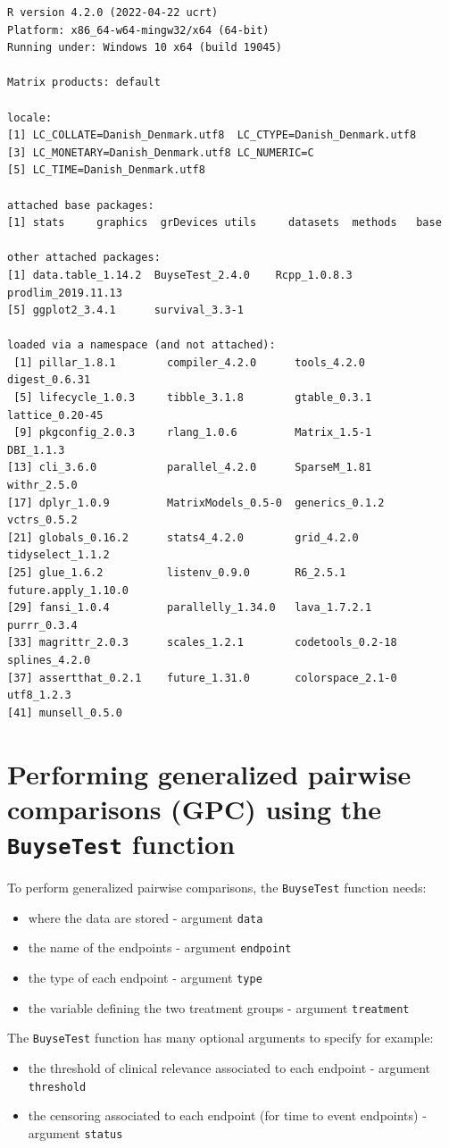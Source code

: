 \documentclass[12pt]{article}
\begin{document}
\begin{verbatim}
R version 4.2.0 (2022-04-22 ucrt)
Platform: x86_64-w64-mingw32/x64 (64-bit)
Running under: Windows 10 x64 (build 19045)

Matrix products: default

locale:
[1] LC_COLLATE=Danish_Denmark.utf8  LC_CTYPE=Danish_Denmark.utf8   
[3] LC_MONETARY=Danish_Denmark.utf8 LC_NUMERIC=C                   
[5] LC_TIME=Danish_Denmark.utf8    

attached base packages:
[1] stats     graphics  grDevices utils     datasets  methods   base     

other attached packages:
[1] data.table_1.14.2  BuyseTest_2.4.0    Rcpp_1.0.8.3       prodlim_2019.11.13
[5] ggplot2_3.4.1      survival_3.3-1    

loaded via a namespace (and not attached):
 [1] pillar_1.8.1        compiler_4.2.0      tools_4.2.0         digest_0.6.31      
 [5] lifecycle_1.0.3     tibble_3.1.8        gtable_0.3.1        lattice_0.20-45    
 [9] pkgconfig_2.0.3     rlang_1.0.6         Matrix_1.5-1        DBI_1.1.3          
[13] cli_3.6.0           parallel_4.2.0      SparseM_1.81        withr_2.5.0        
[17] dplyr_1.0.9         MatrixModels_0.5-0  generics_0.1.2      vctrs_0.5.2        
[21] globals_0.16.2      stats4_4.2.0        grid_4.2.0          tidyselect_1.1.2   
[25] glue_1.6.2          listenv_0.9.0       R6_2.5.1            future.apply_1.10.0
[29] fansi_1.0.4         parallelly_1.34.0   lava_1.7.2.1        purrr_0.3.4        
[33] magrittr_2.0.3      scales_1.2.1        codetools_0.2-18    splines_4.2.0      
[37] assertthat_0.2.1    future_1.31.0       colorspace_2.1-0    utf8_1.2.3         
[41] munsell_0.5.0
\end{verbatim}

\clearpage

\section{Performing generalized pairwise comparisons (GPC) using the \texttt{BuyseTest} function}
\label{sec:orga3be5d9}

To perform generalized pairwise comparisons, the \texttt{BuyseTest} function needs:
\begin{itemize}
\item where the data are stored \hfill - argument \texttt{data}
\item the name of the endpoints \hfill - argument \texttt{endpoint}
\item the type of each endpoint \hfill - argument \texttt{type}
\item the variable defining the two treatment groups \hfill - argument
\texttt{treatment}
\end{itemize}
The \texttt{BuyseTest} function has many optional arguments to specify for example:
\begin{itemize}
\item the threshold of clinical relevance associated to each endpoint \hfill - argument \texttt{threshold}
\item the censoring associated to each endpoint (for time to event endpoints) \hfill - argument \texttt{status}
\end{itemize}
\end{document}
